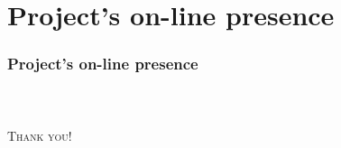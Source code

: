 \documentclass[first,firstsupp,lastsupp,handout,last,hyperref,table]{ETHclass}
\begin{document}
\section{Project's on-line presence}

\begin{frame}
\frametitle{Project's on-line presence}
\centering
\href{http://tpm.docmase.lucadistasioengineering.com/}{}\\
\vspace*{1cm}
\href{https://www.facebook.com/tpm.docmase?ref=hl}{}
\end{frame}

\begin{frame}[plain]
\frametitle{}
\vspace{1cm}
\centering
{\LARGE
\textsc{Thank you!}
}
\end{frame}







%        
%          

\begin{frame}[plain]
\frametitle{}
\end{frame}
\end{document}
